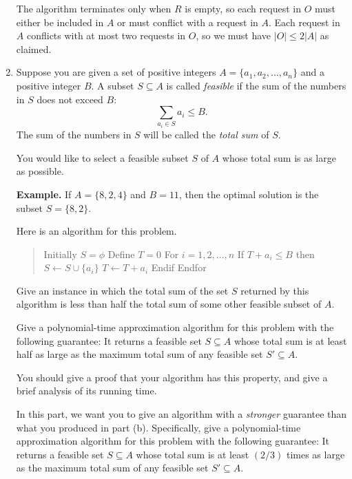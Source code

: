 \documentclass[12pt]{article}
\begin{document}
\begin{enumerate}
{The algorithm terminates only when $R$ is empty, so each request
in $O$ must either be included in $A$ or must conflict with a request
in $A$. Each request in $A$ conflicts with at most two requests in $O$,
so we must have $|O| \le 2|A|$ as claimed.
}


\item

Suppose you are given a set of positive integers
$A = \{a_1, a_2, \ldots, a_n\}$ and a positive integer $B$.
A subset $S \subseteq A$ is called {\em feasible}
if the sum of the numbers in $S$ does not exceed $B$:
$$\sum_{a_i \in S} a_i \leq B.$$
The sum of the numbers in $S$ will be called
the {\em total sum} of $S$.

You would like to select a feasible subset $S$ of $A$
whose total sum is as large as possible.

{\bf Example.}
If $A = \{8, 2, 4\}$ and $B = 11$, then the optimal
solution is the subset $S = \{8, 2\}$.

\medskip
{}
Here is an algorithm for this problem.
\begin{quote}
\begin{code}
Initially $S = \phi$
Define $T = 0$
For $i = 1, 2, \ldots, n$
  If $T + a_i \leq B$ then
    $S \gets S \cup \{a_i\}$
    $T \gets T + a_i$
  Endif
Endfor
\end{code}
\end{quote}

Give an instance in which the total sum of the
set $S$ returned by this algorithm is less than
half the total sum of some other feasible subset of $A$.

Give a polynomial-time approximation algorithm for this problem with
the following guarantee:
It returns a feasible set $S \subseteq A$ whose total sum is
at least half as large as the maximum total sum of
any feasible set $S' \subseteq A$.

You should give a proof that your algorithm has this property,
and give a brief analysis of its running time.

In this part, we want you to give an
algorithm with a {\em stronger} guarantee than what
you produced in part (b).
Specifically, give a polynomial-time approximation algorithm
for this problem with the following guarantee:
It returns a feasible set $S \subseteq A$ whose total sum is
at least $(2/3)$ times as large as the maximum total sum of
any feasible set $S' \subseteq A$.


\end{enumerate}
\end{document}
